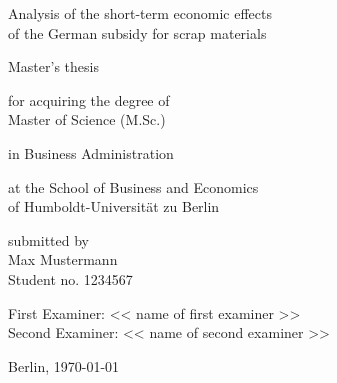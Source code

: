 \begin{titlepage}
    \thispagestyle{empty}
  
    \vspace*{1.5cm}
  
    {\Large
    \noindent Analysis of the short-term economic effects\\
    of the German subsidy for scrap materials}
  
    \vspace{2cm}
  
    {\LARGE
    \noindent
    Master’s thesis}
  
    \vspace{2cm}
  
    {\normalsize
    \noindent for acquiring the degree of\\
    Master of Science (M.Sc.)

    \vspace{0.5cm}

    \noindent in Business Administration
  
    \vspace{0.5cm}
  
    \noindent at the School of Business and Economics\\
    of Humboldt-Universität zu Berlin
  
    \vspace{2cm}
  
    \noindent submitted by\\
    Max Mustermann\\
    Student no. 1234567
  
    \vspace{2cm}
  
    \noindent First Examiner: << name of first examiner >>\\
    Second Examiner: << name of second examiner >>
  
    \vspace{1cm}
  
    \noindent Berlin, \today
    }
  
\end{titlepage}